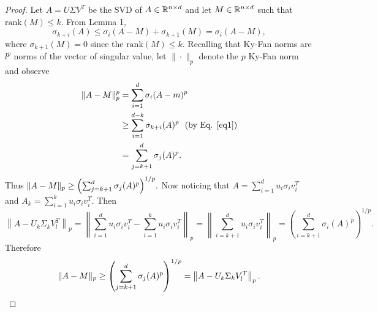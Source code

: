 \documentclass[12pt]{report}
\begin{document}
\begin{problem}
\begin{proof}
Let $A = U \Sigma V^T$ be the SVD of $A \in {\mathbb R}^{n\times d}$ and let $M \in {\mathbb R}^{n \times d}$ such that $\text{rank}(M) \leq k$. From Lemma 1,
\begin{equation}\label{eq1}
    \sigma_{k+i}(A) \leq \sigma_i(A-M) + \sigma_{k+1}(M) = \sigma_i(A-M),
\end{equation}
where $\sigma_{k+1}(M) = 0$ since the $\text{rank}(M) \leq k$. Recalling that Ky-Fan norms are $l^p$ norms of the vector of singular value, let $\| \cdot \|_p$ denote the $p$ Ky-Fan norm and observe
\begin{align*}
    \|A - M\|_p^p &= \sum_{i=1}^d\sigma_i(A-m)^p\\
                &\geq \sum_{i=1}^{d-k}\sigma_{k+i}(A)^p ~~(\text{by Eq. \ref{eq1}})\\
                &= \sum_{j=k+1}^d \sigma_j(A)^p.
\end{align*} 
Thus $\|A - M\|_p \geq {\left(\sum_{j=k+1}^d \sigma_j(A)^p\right)}^{1/p}.$ Now noticing that $A = \sum_{i=1}^d u_i \sigma_i v_i^T$ and $A_k = \sum_{i=1}^k u_i \sigma_i v_i^T$. Then 
\[
    \left\|A - U_k\Sigma_k V_l^T\right\|_p = \left\| \sum_{i=1}^d u_i \sigma_i v_i^T - \sum_{i=1}^k u_i \sigma_i v_i^T\right\|_p = \left\|\sum_{i=k+1}^d u_i \sigma_i v_i^T\right\|_p = \left( \sum_{i=k+1}^d \sigma_i(A)^p \right)^{1/p}.
\]
Therefore
\[
    \|A - M\|_p \geq {\left(\sum_{j=k+1}^d \sigma_j(A)^p\right)}^{1/p} = \left\|A - U_k\Sigma_k V_l^T\right\|_p.
\]


\end{proof}
\end{problem}




\end{document}
